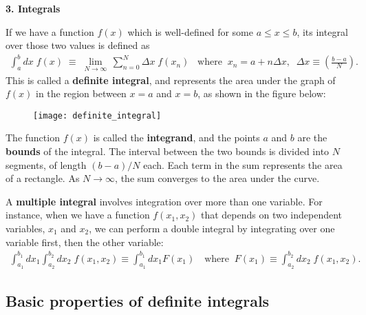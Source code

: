 \documentclass[10pt,a4paper]{article}
\begin{document}
\setcounter{page}{14}

\noindent
{\Large \textbf{3. Integrals}}
\vskip 0.2in
\label{integrals}

If we have a function $f(x)$ which is well-defined for some $a \le x
\le b $, its integral over those two values is defined as
\begin{align}
  \int_a^b dx\; f(x) \;\equiv\; \lim_{N \rightarrow \infty} \, \sum_{n=0}^{N} \Delta x\; f(x_n) \;\;\;\mathrm{where}\;\; x_n = a + n\Delta x, \;\; \Delta x \equiv \left(\frac{b-a}{N}\right).
\end{align}
This is called a \textbf{definite integral}, and represents the area
under the graph of $f(x)$ in the region between $x=a$ and $x=b$, as
shown in the figure below:

\begin{figure}[h]
  \centering\texttt{[image: definite\_integral]}
\end{figure}

\noindent
The function $f(x)$ is called the \textbf{integrand}, and the points
$a$ and $b$ are the \textbf{bounds} of the integral.  The interval
between the two bounds is divided into $N$ segments, of length
$(b-a)/N$ each. Each term in the sum represents the area of a
rectangle. As $N\rightarrow \infty$, the sum converges to the area
under the curve.

A \textbf{multiple integral} involves integration over more than one
variable.  For instance, when we have a function $f(x_1,x_2)$ that
depends on two independent variables, $x_1$ and $x_2$, we can perform
a double integral by integrating over one variable first, then the
other variable:
\begin{align}
  \int_{a_1}^{b_1} dx_1 \int_{a_2}^{b_2} dx_2 \; f(x_1, x_2) \equiv \int_{a_1}^{b_1} dx_1 F(x_1)\quad\text{where}\;\;F(x_1) \equiv \int_{a_2}^{b_2} dx_2 \; f(x_1, x_2).
\end{align}

\subsection{Basic properties of definite integrals}
\label{basic-properties-of-definite-integrals}
\end{document}
